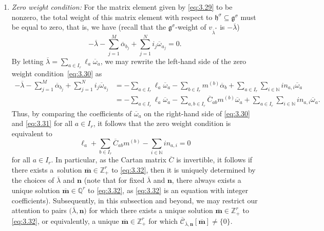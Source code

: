 \documentclass[pdftex]{sigma}
\numberwithin{equation}{section}
\begin{document}
\begin{enumerate}\itemsep=0pt
\item[$(1)$] \emph{Zero weight condition:} For the matrix element given by \eqref{eq:3.29} to be nonzero, the total weight of this matrix element with respect to $\mathfrak{h}^{\sigma} \subseteq\mathfrak{g}^{\sigma}$ must be equal to zero, that is, we have (recall that the $\mathfrak{g}^{\sigma}$-weight of $v_{\overline{\lambda}^*}$ is $-\overline{\lambda}$)
\begin{equation}\label{eq:3.30}
-\overline{\lambda}-\sum_{j=1}^M\overline{\alpha}_{b_j}+ \sum_{j=1}^Ni_j\overline{\omega}_{a_j}=0.
\end{equation}
By letting $\overline{\lambda}=\sum_{a\in I_r}\ell_a \overline{\omega}_a$, we may rewrite the left-hand side of the zero weight condition~\eqref{eq:3.30} as
\begin{align}
-\overline{\lambda}-\sum_{j=1}^M\overline{\alpha}_{b_j}+ \sum_{j=1}^Ni_j\overline{\omega}_{a_j}
&=-\sum_{a\in I_r}\ell_a\overline{\omega}_a-\sum_{b\in I_r}m^{(b)} \overline{\alpha}_b+\sum_{a\in I_r}\sum_{i\in\mathbb{N}} in_{a,i}\overline{\omega}_a\nonumber\\
&=-\sum_{a\in I_r}\ell_a\overline{\omega}_a-\sum_{a,b\in I_r}\overline{C}_{ab} m^{(b)}\overline{\omega}_a+\sum_{a\in I_r}\sum_{i\in \mathbb{N}}in_{a,i}\overline{\omega}_a.\label{eq:3.31}
\end{align}
Thus, by comparing the coefficients of $\overline{\omega}_a$ on the right-hand side of \eqref{eq:3.30} and \eqref{eq:3.31} for all $a\in I_r$, it follows that the zero weight condition is equivalent to
\begin{equation}\label{eq:3.32}
\ell_a+\sum_{b\in I_r}\overline{C}_{ab} m^{(b)}-\sum_{i\in \mathbb{N}}in_{a,i}=0
\end{equation}
for all $a\in I_r$. In particular, as the Cartan matrix $\overline{C}$ is invertible, it follows if there exists a~solution $\overline{\mathbf{m}}\in\mathbb{Z}_+^r$ to \eqref{eq:3.32}, then it is uniquely determined by the choices of $\overline{\lambda}$ and $\mathbf{n}$ (note that for fixed $\overline{\lambda}$ and $\mathbf{n}$, there always exists a unique solution $\overline{\mathbf{m}}\in\mathbb{Q}^r$ to \eqref{eq:3.32}, as \eqref{eq:3.32} is an equation with integer coefficients). Subsequently, in this subsection and beyond, we may restrict our attention to pairs $\bigl(\overline{\lambda},\mathbf{n}\bigr)$ for which there exists a unique solution $\overline{\mathbf{m}}\in\mathbb{Z}_+^r$ to \eqref{eq:3.32}, or equivalently, a unique $\overline{ \mathbf{m}}\in\mathbb{Z}_+^r$ for which $\overline{ \mathcal{C}}_{\overline{\lambda},\mathbf{n}}[\overline{ \mathbf{m}}]\neq\{0\}$.


\end{enumerate}
\end{document}
